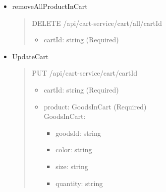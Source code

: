 \begin{itemize}
	\item removeAllProductInCart
	      \begin{quote}
		      DELETE /api/cart-service/cart/all/{cartId}
		      \begin{itemize}
			      \item cartId: string (Required)
		      \end{itemize}
	      \end{quote}

	\item UpdateCart
	      \begin{quote}
		      PUT /api/cart-service/cart/{cartId}
		      \begin{itemize}
			      \item cartId: string (Required)
			      \item product: GoodsInCart (Required)\\
							GoodsInCart:
							\begin{itemize}
								\item goodsId: string 
								\item color: string 
								\item size: string 
								\item quantity: string 
							\end{itemize}
		      \end{itemize}
	      \end{quote}
\end{itemize}

